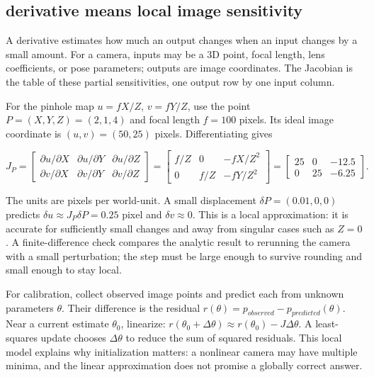 \subsection{derivative means local image sensitivity}\label{derivative-means-local-image-sensitivity}

A derivative estimates how much an output changes when an input changes by a small amount. For a camera, inputs may be a 3D point, focal length, lens coefficients, or pose parameters; outputs are image coordinates. The Jacobian is the table of these partial sensitivities, one output row by one input column.

For the pinhole map \(u=fX/Z\), \(v=fY/Z\), use the point \(P=(X,Y,Z)=(2,1,4)\) and focal length \(f=100\) pixels. Its ideal image coordinate is \((u,v)=(50,25)\) pixels. Differentiating gives

\[
J_P=\begin{bmatrix}
\partial u/\partial X&\partial u/\partial Y&\partial u/\partial Z\\
\partial v/\partial X&\partial v/\partial Y&\partial v/\partial Z
\end{bmatrix}
=\begin{bmatrix}f/Z&0&-fX/Z^2\\0&f/Z&-fY/Z^2\end{bmatrix}
=\begin{bmatrix}25&0&-12.5\\0&25&-6.25\end{bmatrix}.
\]

The units are pixels per world-unit. A small displacement \(\delta P=(0.01,0,0)\) predicts \(\delta u\approx J_P\delta P=0.25\) pixel and \(\delta v\approx0\). This is a local approximation: it is accurate for sufficiently small changes and away from singular cases such as \(Z=0\). A finite-difference check compares the analytic result to rerunning the camera with a small perturbation; the step must be large enough to survive rounding and small enough to stay local.

For calibration, collect observed image points and predict each from unknown parameters \(\theta\). Their difference is the residual \(r(\theta)=p_{observed}-p_{predicted}(\theta)\). Near a current estimate \(\theta_0\), linearize: \(r(\theta_0+\Delta\theta)\approx r(\theta_0)-J\Delta\theta\). A least-squares update chooses \(\Delta\theta\) to reduce the sum of squared residuals. This local model explains why initialization matters: a nonlinear camera may have multiple minima, and the linear approximation does not promise a globally correct answer.

